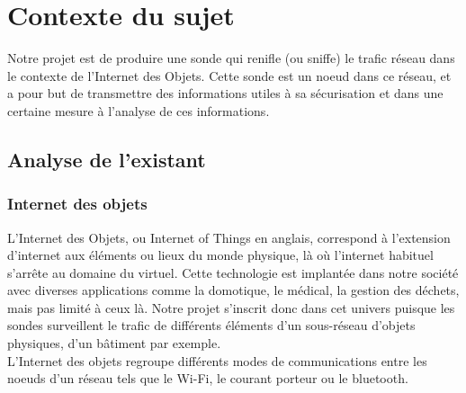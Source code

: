 \chapter{Contexte du sujet}
\label{chap:contexte}
	Notre projet est de produire une sonde qui renifle (ou sniffe) le trafic réseau dans le contexte de l'Internet des Objets. Cette sonde est un noeud dans ce réseau, et a pour but de transmettre des informations utiles à sa sécurisation et dans une certaine mesure à l'analyse de ces informations.

\section{Analyse de l'existant}
	
	\subsection{Internet des objets}
		L'Internet des Objets, ou Internet of Things en anglais, correspond à l'extension d'internet aux éléments ou lieux du monde physique, là où l'internet habituel s'arrête au domaine du virtuel.
		Cette technologie est implantée dans notre société avec diverses applications comme la domotique, le médical, la gestion des déchets, mais pas limité à ceux là.
		Notre projet s'inscrit donc dans cet univers puisque les sondes surveillent le trafic de différents éléments d'un sous-réseau d'objets physiques, d'un bâtiment par exemple. \\
		L'Internet des objets regroupe différents modes de communications entre les noeuds d'un réseau tels que le Wi-Fi, le courant porteur ou le bluetooth.%
		
